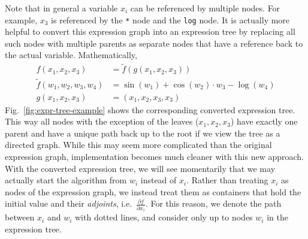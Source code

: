 Note that in general a variable $x_i$ can be referenced by multiple nodes.
For example, $x_3$ is referenced by the \verb|*| node and the \verb|log| node.
It is actually more helpful to convert this expression graph into an expression tree
by replacing all such nodes with multiple parents as separate nodes
that have a reference back to the actual variable.
Mathematically,
\begin{align}
    f(x_1, x_2, x_3) &= \tilde{f}(g(x_1, x_2, x_3)) \label{eq:f-tree-example} \\
    \tilde{f}(w_1, w_2, w_3, w_4) &= \sin(w_1) + \cos(w_2) \cdot w_3 - \log(w_4) \nonumber \\
    g(x_1, x_2, x_3) &= (x_1, x_2, x_3, x_3) \nonumber
\end{align}
Fig.~\ref{fig:expr-tree-example} shows the corresponding converted expression tree.
This way all nodes with the exception of the leaves ($x_1,x_2,x_3$) have exactly one parent
and have a unique path back up to the root if we view the tree as a directed graph.
While this may seem more complicated than the original expression graph,
implementation becomes much cleaner with this new approach.
With the converted expression tree, we will see momentarily that 
we may actually start the algorithm from $w_i$ instead of $x_i$.
Rather than treating $x_i$ as nodes of the expression graph,
we instead treat them as containers that hold the initial value and their \emph{adjoints}, 
i.e.\ $\frac{\partial f}{\partial x_i}$.
For this reason, we denote the path between $x_i$ and $w_i$ with dotted lines,
and consider only up to nodes $w_i$ in the expression tree.

